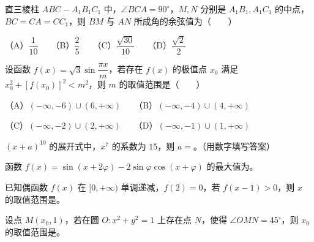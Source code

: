 \begin{question}
直三棱柱 $ABC-A_1B_1C_1$ 中，$\angle BCA=90^\circ$，$M,N$ 分别是 $A_1B_1,A_1C_1$ 的中点，$BC=CA=CC_1$，则 $BM$ 与 $AN$ 所成角的余弦值为\mbox{（　　）}

（A）$\dfrac1{10}$　　（B）$\dfrac25$　　（C）$\dfrac{\sqrt{30}}{10}$　　（D）$\dfrac{\sqrt2}{2}$

\end{question}
\begin{question}
设函数 $f(x)=\sqrt3\sin\dfrac{\pi x}{m}$，若存在 $f(x)$ 的极值点 $x_0$ 满足 $x_0^2+[f(x_0)]^2<m^2$，则 $m$ 的取值范围是\mbox{（　　）}

（A）$(-\infty,-6)\cup(6,+\infty)$　　（B）$(-\infty,-4)\cup(4,+\infty)$

（C）$(-\infty,-2)\cup(2,+\infty)$　　（D）$(-\infty,-1)\cup(1,+\infty)$

\end{question}

\begin{question}
$(x+a)^{10}$ 的展开式中，$x^7$ 的系数为 $15$，则 $a=$\gkblank{}。（用数字填写答案）

\end{question}
\begin{question}
函数 $f(x)=\sin(x+2\varphi)-2\sin\varphi\cos(x+\varphi)$ 的最大值为\gkblank{}。

\end{question}
\begin{question}
已知偶函数 $f(x)$ 在 $[0,+\infty)$ 单调递减，$f(2)=0$，若 $f(x-1)>0$，则 $x$ 的取值范围是\gkblank{}。

\end{question}
\begin{question}
设点 $M(x_0,1)$，若在圆 $O:x^2+y^2=1$ 上存在点 $N$，使得 $\angle OMN=45^\circ$，则 $x_0$ 的取值范围是\gkblank{}。

\end{question}

